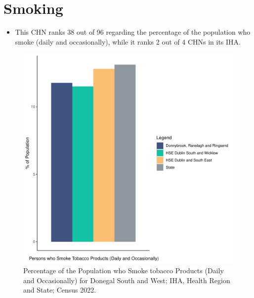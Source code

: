 \documentclass{article}
\begin{document}
\pagebreak

\section{Smoking}\label{sect:Smoking}
\begin{itemize}
\item This CHN ranks  38 out of 96 regarding the percentage of the population who smoke (daily and occasionally), while it ranks   2 out of 4 CHNs in its IHA.
\end{itemize}
\begin{figure}[H]
	\centering
	\includegraphics[width = 120mm]{../figures/SmokingED.pdf}
	\caption{Percentage of the Population who Smoke tobacco Products (Daily and Occasionally) for Donegal South and West; IHA, Health Region and State; Census 2022.}
	\label{fig:2ae19629-1a6a-13a3-e055-000000000001}
	\end{figure}
	
\end{document}
